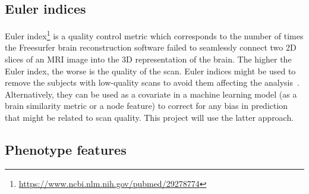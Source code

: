 




\subsection{Euler indices}
Euler index\footnote{\url{https://www.ncbi.nlm.nih.gov/pubmed/29278774}} is a quality control metric which corresponds to the number of times the Freesurfer brain reconstruction software failed to seamlessly connect two 2D slices of an MRI image into the 3D representation of the brain. The higher the Euler index, the worse is the quality of the scan. Euler indices might be used to remove the subjects with low-quality scans to avoid them affecting the analysis~\cite{kaufmann2019}. Alternatively, they can be used as a covariate in a machine learning model (as a brain similarity metric or a node feature) to correct for any bias in prediction that might be related to scan quality. This project will use the latter approach.


\subsection{Phenotype features}

